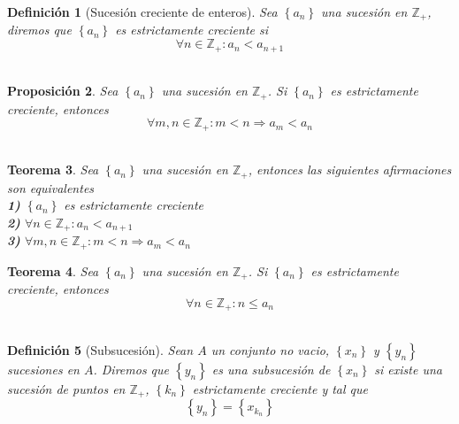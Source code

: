 \documentclass[oneside]{book} %
\theoremstyle{Teorema}
\newtheorem{Definicion}{Definición}[chapter]
\newtheorem{Teorema}[Definicion]{Teorema}
\newtheorem{Proposicion}[Definicion]{Proposición}
\theoremstyle{Ejemplos}
\theoremstyle{[Obs]}
\renewcommand{\{}{\left\lbrace} %
\renewcommand{\}}{\right\rbrace} %
\begin{document}
			\begin{Definicion}[Sucesión creciente de enteros]
				
				Sea $\{ a_n \}$ una sucesión en $\mathbb{Z}_{+}$, diremos que $\{ a_n \}$ es estrictamente creciente si \\

				\[ \forall n \in \mathbb{Z}_{+} : a_n < a_{n + 1} \] \\

			\end{Definicion}

			\begin{Proposicion}
				
				Sea $\{ a_n \}$ una sucesión en $\mathbb{Z}_{+}$. Si $\{ a_n \}$ es estrictamente creciente, entonces \\

				\[ \forall m, n \in \mathbb{Z}_{+} : m < n \Rightarrow a_m < a_n \] \\

			\end{Proposicion}

			\begin{Teorema}
				
				Sea $\{ a_n \}$ una sucesión en $\mathbb{Z}_{+}$, entonces las siguientes afirmaciones son equivalentes \\

				\textbf{1)} $\{ a_n \}$ es estrictamente creciente \\

				\textbf{2)} $\forall n \in \mathbb{Z}_{+} : a_n < a_{n + 1}$ \\

				\textbf{3)} $\forall m, n \in \mathbb{Z}_{+} : m < n \Rightarrow a_m < a_{n}$ \\

			\end{Teorema}

			\begin{Teorema}
				
				Sea $\{ a_n \}$ una sucesión en $\mathbb{Z}_{+}$. Si $\{ a_n \}$ es estrictamente creciente, entonces \\

				\[ \forall n \in \mathbb{Z}_{+} : n \leq a_n \] \\

			\end{Teorema}

			\begin{Definicion}[Subsucesión]

				Sean $A$ un conjunto no vacio, $\{ x_n \}$ y $\{ y_n \}$ sucesiones en $A$. Diremos que $\{ y_n \}$ es una subsucesión de $\{ x_n \}$ si existe una sucesión de puntos en $\mathbb{Z}_{+}$, $\{ k_n \}$ estrictamente creciente y tal que \\

				\[ \{ y_n \} = \{ x_{k_n} \} \] \\
				
			\end{Definicion}
\end{document}
